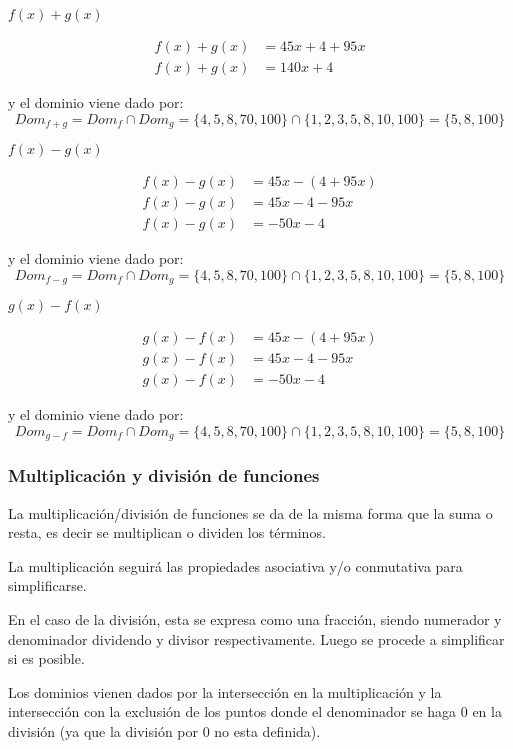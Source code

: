     $ f(x)+g(x) $

    \begin{align*}
        f(x)+g(x) &= 45x+4+95x 		\\
        f(x)+ g(x)&= 140x + 4
    \end{align*}

    y el dominio viene dado por:
    $$ Dom_{f+g} = Dom_f \cap Dom_g =\{4,5,8,70,100\} \cap \{1,2,3,5,8,10,100\}=\{5,8,100\} $$


    $ f(x)-g(x) $

    \begin{align*}
        f(x)-g(x) &= 45x-(4+95x) 		\\
        f(x)- g(x)&= 45x - 4 -95x\\
        f(x)- g(x)&= -50x - 4
    \end{align*}

    y el dominio viene dado por:
    $$ Dom_{f-g} = Dom_f \cap Dom_g =\{4,5,8,70,100\} \cap \{1,2,3,5,8,10,100\}=\{5,8,100\} $$


    $ g(x)-f(x) $

    \begin{align*}
        g(x)-f(x) &= 45x-(4+95x) 		\\
        g(x)-f(x)&= 45x - 4 -95x\\
        g(x)-f(x)&= -50x - 4
    \end{align*}

    y el dominio viene dado por:
    $$ Dom_{g-f} = Dom_f \cap Dom_g =\{4,5,8,70,100\} \cap \{1,2,3,5,8,10,100\}=\{5,8,100\} $$

\subsubsection*{Multiplicación y división de funciones} \label{Multiplicacion_de_funciones}

La multiplicación/división de funciones se da de la misma forma que la suma o
resta, es decir se multiplican o dividen los términos.

La multiplicación seguirá las propiedades asociativa y/o conmutativa para simplificarse.

En el caso de la división, esta se expresa como una fracción, siendo numerador
y denominador dividendo y divisor respectivamente. Luego se procede a simplificar
si es posible.

Los dominios vienen dados por la intersección en la multiplicación y la intersección
con la exclusión de los puntos donde el denominador se haga 0 en la división
(ya que la división por 0 no esta definida).


